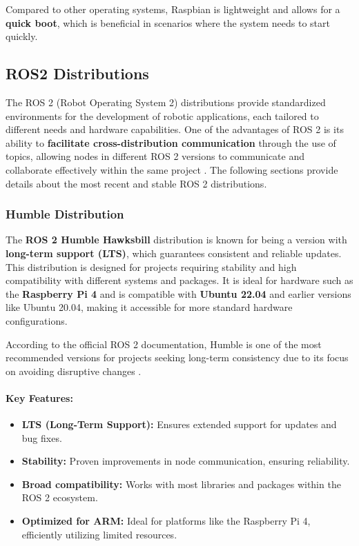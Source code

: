 Compared to other operating systems, Raspbian is lightweight and allows for a \textbf{quick boot}, which is beneficial in scenarios where the system needs to start quickly.


\subsection{ROS2 Distributions}

The ROS 2 (Robot Operating System 2) distributions provide standardized environments for the development of robotic applications, each tailored to different needs and hardware capabilities. One of the advantages of ROS 2 is its ability to \textbf{facilitate cross-distribution communication} through the use of topics, allowing nodes in different ROS 2 versions to communicate and collaborate effectively within the same project \cite{ros_docs}. The following sections provide details about the most recent and stable ROS 2 distributions.

\subsubsection{Humble Distribution}

The \textbf{ROS 2 Humble Hawksbill} distribution is known for being a version with \textbf{long-term support (LTS)}, which guarantees consistent and reliable updates. This distribution is designed for projects requiring stability and high compatibility with different systems and packages. It is ideal for hardware such as the \textbf{Raspberry Pi 4} and is compatible with \textbf{Ubuntu 22.04} and earlier versions like Ubuntu 20.04, making it accessible for more standard hardware configurations.

According to the official ROS 2 documentation, Humble is one of the most recommended versions for projects seeking long-term consistency due to its focus on avoiding disruptive changes \cite{humble_documentation}.

\paragraph{Key Features:}
\begin{itemize}
    \item \textbf{LTS (Long-Term Support):} Ensures extended support for updates and bug fixes.
    \item \textbf{Stability:} Proven improvements in node communication, ensuring reliability.
    \item \textbf{Broad compatibility:} Works with most libraries and packages within the ROS 2 ecosystem.
    \item \textbf{Optimized for ARM:} Ideal for platforms like the Raspberry Pi 4, efficiently utilizing limited resources.
\end{itemize}

